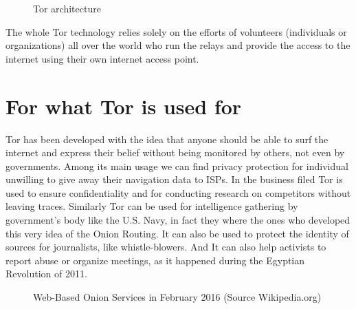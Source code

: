 \documentclass[runningheads,a4paper]{llncs}
\begin{document}
\begin{figure}[]
        \caption{ Tor architecture}
        \label{fig:fig_tor_arch}
\end{figure}


The whole Tor technology relies solely on the efforts of volunteers (individuals or organizations) all over the world who run the relays and provide the access to the internet using their own internet access point.



\section{For what Tor is used for}\label{usage}
Tor has been developed with the idea that anyone should be able to surf the internet and express their belief without being monitored by others, not even by governments. Among its main usage we can find privacy protection for individual unwilling to give away their navigation data to ISPs. In the business filed Tor is used to ensure confidentiality and for conducting  research on competitors without leaving traces. Similarly Tor can be used for intelligence gathering by government's body like the U.S. Navy, in fact they where the ones who  developed this very idea of the Onion Routing. It can also be used to protect the identity of sources for journalists, like whistle-blowers. And It can also help activists to report abuse or organize meetings, as it happened during the Egyptian Revolution of 2011. \cite{WASH_715}

\begin{figure}[]
        \caption{Web-Based Onion Services in February 2016 (Source Wikipedia.org)}
        \label{fig:fig_tor_ill}
\end{figure}
\end{document}
